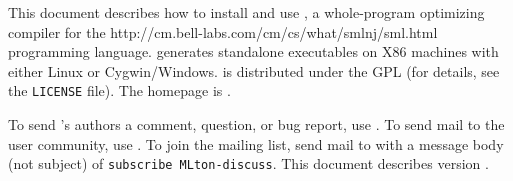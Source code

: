 This document describes how to install and use {\mlton}, a
whole-program optimizing compiler for the
		  {http://cm.bell-labs.com/cm/cs/what/smlnj/sml.html}
programming language.
{\mlton} generates standalone executables on X86 machines with either
Linux or Cygwin/Windows. 
{\mlton} is distributed under the GPL (for details, see the 
{\tt LICENSE} file).
The {\mlton} homepage is \absolutelink{}.

To send {\mlton}'s authors a comment, question, or bug report, use
\mltonmail.
To send mail to the {\mlton} user community, use
.
To join the {\mlton} mailing list, send mail to
 with a message body (not subject) of
{\tt subscribe MLton-discuss}.
This document describes {\mlton} version {\version}.

